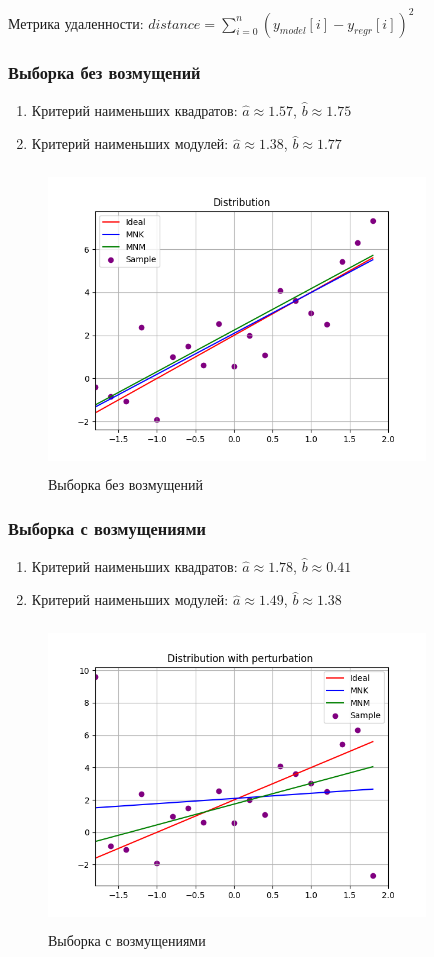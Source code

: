 \documentclass[a4paper,14pt]{article}
\begin{document}
	\noindent Метрика удаленности: $distance = \sum_{i=0}^{n}(y_{model}[i]-y_{regr}[i])^2$
	\subsubsection{Выборка без возмущений}
	\begin{enumerate}
		\item{Критерий наименьших квадратов:}
		$\hat{a}\approx 1.57$, $\hat{b}\approx 1.75$
		\item{Критерий наименьших модулей:}
		$\hat{a}\approx 1.38$, $\hat{b}\approx 1.77$
	\end{enumerate}
	\begin{figure}[H]
		\centering
		\includegraphics[width = 10cm, height = 8cm]{../image/lab6_1.png}
		\caption{Выборка без возмущений}
		\label{w/o_pert}
	\end{figure}
	
	\subsubsection{Выборка с возмущениями}
	\begin{enumerate}
		\item{Критерий наименьших квадратов:}
		$\hat{a}\approx 1.78$, $\hat{b}\approx 0.41$
		\item{Критерий наименьших модулей:}
		$\hat{a}\approx 1.49$, $\hat{b}\approx 1.38$
	\end{enumerate}
	\begin{figure}[H]
		\centering
		\includegraphics[width = 10cm, height = 8cm]{../image/lab6_2.png}
		\caption{Выборка с возмущениями}
		\label{w_pert}
	\end{figure}
	
\end{document}
